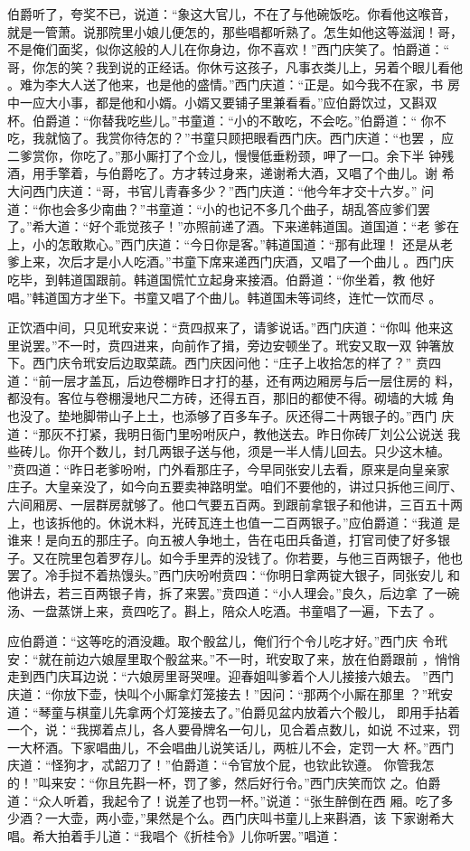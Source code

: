 伯爵听了，夸奖不已，说道：“象这大官儿，不在了与他碗饭吃。你看他这喉音，
就是一管萧。说那院里小娘儿便怎的，那些唱都听熟了。怎生如他这等滋润！哥，
不是俺们面奖，似你这般的人儿在你身边，你不喜欢！”西门庆笑了。怕爵道：“
哥，你怎的笑？我到说的正经话。你休亏这孩子，凡事衣类儿上，另着个眼儿看他
。难为李大人送了他来，也是他的盛情。”西门庆道：“正是。如今我不在家，书
房中一应大小事，都是他和小婿。小婿又要铺子里兼看看。”应伯爵饮过，又斟双
杯。伯爵道：“你替我吃些儿。”书童道：“小的不敢吃，不会吃。”伯爵道：“
你不吃，我就恼了。我赏你待怎的？”书童只顾把眼看西门庆。西门庆道：“也罢
，应二爹赏你，你吃了。”那小厮打了个佥儿，慢慢低垂粉颈，呷了一口。余下半
钟残酒，用手擎着，与伯爵吃了。方才转过身来，递谢希大酒，又唱了个曲儿。谢
希大问西门庆道：“哥，书官儿青春多少？”西门庆道：“他今年才交十六岁。”
问道：“你也会多少南曲？”书童道：“小的也记不多几个曲子，胡乱答应爹们罢
了。”希大道：“好个乖觉孩子！”亦照前递了酒。下来递韩道国。道国道：“老
爹在上，小的怎敢欺心。”西门庆道：“今日你是客。”韩道国道：“那有此理！
还是从老爹上来，次后才是小人吃酒。”书童下席来递西门庆酒，又唱了一个曲儿
。西门庆吃毕，到韩道国跟前。韩道国慌忙立起身来接酒。伯爵道：“你坐着，教
他好唱。”韩道国方才坐下。书童又唱了个曲儿。韩道国未等词终，连忙一饮而尽
。

正饮酒中间，只见玳安来说：“贲四叔来了，请爹说话。”西门庆道：“你叫
他来这里说罢。”不一时，贲四进来，向前作了揖，旁边安顿坐了。玳安又取一双
钟箸放下。西门庆令玳安后边取菜蔬。西门庆因问他：“庄子上收拾怎的样了？”
贲四道：“前一层才盖瓦，后边卷棚昨日才打的基，还有两边厢房与后一层住房的
料，都没有。客位与卷棚漫地尺二方砖，还得五百，那旧的都使不得。砌墙的大城
角也没了。垫地脚带山子上土，也添够了百多车子。灰还得二十两银子的。”西门
庆道：“那灰不打紧，我明日衙门里吩咐灰户，教他送去。昨日你砖厂刘公公说送
我些砖儿。你开个数儿，封几两银子送与他，须是一半人情儿回去。只少这木植。
”贲四道：“昨日老爹吩咐，门外看那庄子，今早同张安儿去看，原来是向皇亲家
庄子。大皇亲没了，如今向五要卖神路明堂。咱们不要他的，讲过只拆他三间厅、
六间厢房、一层群房就够了。他口气要五百两。到跟前拿银子和他讲，三百五十两
上，也该拆他的。休说木料，光砖瓦连土也值一二百两银子。”应伯爵道：“我道
是谁来！是向五的那庄子。向五被人争地土，告在屯田兵备道，打官司使了好多银
子。又在院里包着罗存儿。如今手里弄的没钱了。你若要，与他三百两银子，他也
罢了。冷手挝不着热馒头。”西门庆吩咐贲四：“你明日拿两锭大银子，同张安儿
和他讲去，若三百两银子肯，拆了来罢。”贲四道：“小人理会。”良久，后边拿
了一碗汤、一盘蒸饼上来，贲四吃了。斟上，陪众人吃酒。书童唱了一遍，下去了
。

应伯爵道：“这等吃的酒没趣。取个骰盆儿，俺们行个令儿吃才好。”西门庆
令玳安：“就在前边六娘屋里取个骰盆来。”不一时，玳安取了来，放在伯爵跟前
，悄悄走到西门庆耳边说：“六娘房里哥哭哩。迎春姐叫爹着个人儿接接六娘去。
”西门庆道：“你放下壶，快叫个小厮拿灯笼接去！”因问：“那两个小厮在那里
？”玳安道：“琴童与棋童儿先拿两个灯笼接去了。”伯爵见盆内放着六个骰儿，
即用手拈着一个，说：“我掷着点儿，各人要骨牌名一句儿，见合着点数儿，如说
不过来，罚一大杯酒。下家唱曲儿，不会唱曲儿说笑话儿，两桩儿不会，定罚一大
杯。”西门庆道：“怪狗才，忒韶刀了！”伯爵道：“令官放个屁，也钦此钦遵。
你管我怎的！”叫来安：“你且先斟一杯，罚了爹，然后好行令。”西门庆笑而饮
之。伯爵道：“众人听着，我起令了！说差了也罚一杯。”说道：“张生醉倒在西
厢。吃了多少酒？一大壶，两小壶，”果然是个么。西门庆叫书童儿上来斟酒，该
下家谢希大唱。希大拍着手儿道：“我唱个《折桂令》儿你听罢。”唱道：

